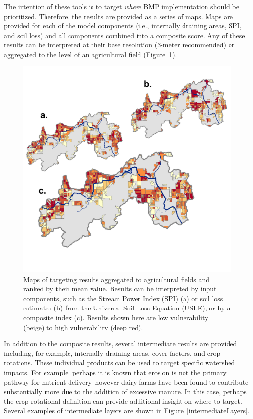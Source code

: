 \documentclass[12pt]{article}
\begin{document}
The intention of these tools is to target \emph{where} BMP implementation should be prioritized. Therefore, the results are provided as a series of maps. Maps are provided for each of the model components (i.e., internally draining areas, SPI, and soil loss) and all components combined into a composite score. Any of these results can be interpreted at their base resolution (3-meter recommended) or aggregated to the level of an agricultural field (Figure~\ref{fieldScaleTargeting}).

\begin{figure}
  \centering
    \includegraphics[width=\textwidth]{fieldScaleTargeting}
  \caption{Maps of targeting results aggregated to agricultural fields and ranked by their mean value. Results can be interpreted by input components, such as the Stream Power Index (SPI) (a) or soil loss estimates (b) from the Universal Soil Loss Equation (USLE), or by a composite index (c). Results shown here are low vulnerability (beige) to high vulnerability (deep red).}
  \label{fieldScaleTargeting}
\end{figure}

In addition to the composite results, several intermediate results are provided including, for example, internally draining areas, cover factors, and crop rotations. These individual products can be used to target specific watershed impacts. For example, perhaps it is known that erosion is not the primary pathway for nutrient delivery, however dairy farms have been found to contribute substantially more due to the addition of excessive manure. In this case, perhaps the crop rotational definition can provide additional insight on where to target. Several examples of intermediate layers are shown in Figure~\ref{intermediateLayers}.
\end{document}
